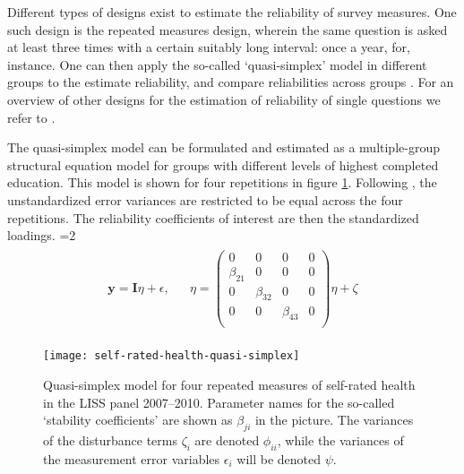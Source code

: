 \documentclass[a4paper,11pt]{article}
\newcommand{\0}{\boldsymbol{0}}
\begin{document}
Different types of designs exist to estimate the reliability of survey measures. One such design is the repeated measures design, wherein the
same question is asked at least three times with a certain suitably long interval: once a year, for, instance. 
One can then apply the so-called `quasi-simplex' model in different groups to the estimate
reliability, and compare reliabilities across groups \citep{heise1970validity,wiley35wiley}. For an overview of other designs for the estimation of reliability of single questions we refer to \cite{alwin_margins_2007}. 

The quasi-simplex model can be formulated and estimated as a multiple-group structural equation model for groups with different  levels of highest completed education. This model is shown for four repetitions in figure 
\ref{fig:model}. Following \cite{wiley35wiley}, the unstandardized error variances are restricted to be equal across the four repetitions. The reliability coefficients of interest are then the standardized loadings. 
=2
\begin{eqnarray*}\begin{split}
\textbf{y} =  \textbf{I} {\eta} + \epsilon,& &
{\eta} = \begin{pmatrix}
	0 & 0 & 0 & 0\\
	\beta_{21} & 0 & 0 & 0\\
	0 & \beta_{32} & 0 & 0\\
	0 & 0 & \beta_{43} & 0\\	
\end{pmatrix} {\eta} + \zeta
\end{split}
\end{eqnarray*}
\fi


\begin{figure}[bt]\begin{center}
\caption{Quasi-simplex model for four repeated measures of self-rated health in the LISS panel 2007--2010. Parameter names for the 
	so-called `stability coefficients' are shown as $\beta_{ji}$ in the picture. The variances of the disturbance terms $\zeta_i$ are denoted
	$\phi_{ii}$, while the variances of the measurement error variables $\epsilon_i$ will be denoted $\psi$.}
\label{fig:model}
\texttt{[image: self-rated-health-quasi-simplex]}
\end{center}
\end{figure}
\end{document}
